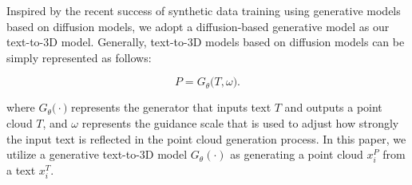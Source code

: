 
Inspired by the recent success of synthetic data training using generative models based on diffusion models, we adopt a diffusion-based generative model as our text-to-3D model. Generally, text-to-3D models based on diffusion models can be simply represented as follows:

\begin{equation}
\label{eq:gtheta}
P = G_{\theta} \bigl(T, \omega \bigr).
\end{equation}

where $G_{\theta} \bigl( \cdot \bigr)$ represents the generator that inputs text $T$ and outputs a point cloud $T$, and $\omega$ represents the guidance scale that is used to adjust how strongly the input text is reflected in the point cloud generation process.
In this paper, we utilize a generative text-to-3D model $G_{\theta}(\cdot)$ as generating a point cloud $x_i^P$ from a text $x_i^T$.


